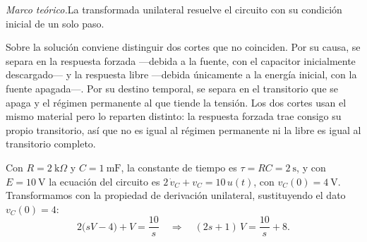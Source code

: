 \documentclass[10pt,a4paper]{article}
\newcommand{\teoria}[1]{\noindent\textit{Marco teórico.}\enspace #1\par\smallskip}
\begin{document}
\teoria{La transformada unilateral resuelve el circuito con su condición
inicial de un solo paso.

Sobre la solución conviene distinguir dos cortes que no coinciden. Por su
causa, se separa en la respuesta forzada ---debida a la fuente, con el
capacitor inicialmente descargado--- y la respuesta libre ---debida
únicamente a la energía inicial, con la fuente apagada---. Por su destino
temporal, se separa en el transitorio que se apaga y el régimen permanente
al que tiende la tensión. Los dos cortes usan el mismo material pero lo reparten
distinto: la respuesta forzada trae consigo su propio transitorio, así que
no es igual al régimen permanente ni la libre es igual al transitorio completo.}

Con $R=2\ \text{k}\Omega$ y $C=1\ \text{mF}$, la constante de tiempo es
$\tau=RC=2\ \text{s}$, y con $E=10\ \text{V}$ la ecuación del circuito es
$2\,\dot v_C+v_C=10\,u(t)$, con $v_C(0)=4\ \text{V}$. Transformamos con la
propiedad de derivación unilateral, sustituyendo el dato $v_C(0)=4$:
\[
	2\bigl(sV-4\bigr)+V=\frac{10}{s}
	\quad\Longrightarrow\quad
	(2s+1)\,V=\frac{10}{s}+8.
\]
\end{document}
